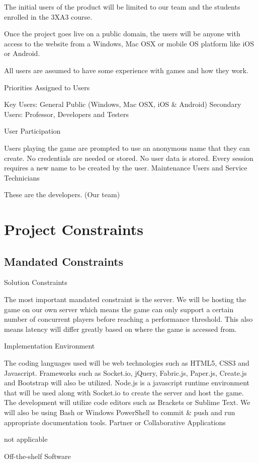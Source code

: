 \documentclass[12pt]{article}
\begin{document}
The initial users of the product will be limited to our team and the students enrolled in the 3XA3 course.

Once the project goes live on a public domain, the users will be anyone with access to the website from a Windows, Mac OSX or mobile OS platform like iOS or Android.

All users are assumed to have some experience with games and how they work.

Priorities Assigned to Users

Key Users: General Public (Windows, Mac OSX, iOS & Android) 
Secondary Users: Professor, Developers and Testers

User Participation

Users playing the game are prompted to use an anonymous name that they can create. No credentials are needed or stored.
No user data is stored. Every session requires a new name to be created by the user.
Maintenance Users and Service Technicians

These are the developers. (Our team)
\section{Project Constraints}
\subsection{Mandated Constraints}
Solution Constraints

The most important mandated constraint is the server. We will be hosting the game on our own server which means the game can only support a certain number of concurrent players before reaching a performance threshold. This also means latency will differ greatly based on where the game is accessed from.

Implementation Environment

The coding languages used will be web technologies such as HTML5, CSS3 and Javascript.
Frameworks such as Socket.io, jQuery, Fabric.js, Paper.js, Create.js and Bootstrap will also be utilized.
Node.js is a javascript runtime environment that will be used along with Socket.io to create the server and host the game.
The development will utilize code editors such as Brackets or Sublime Text. We will also be using Bash or Windows PowerShell to commit & push and run appropriate documentation tools.
Partner or Collaborative Applications

not applicable

Off-the-shelf Software
\end{document}
